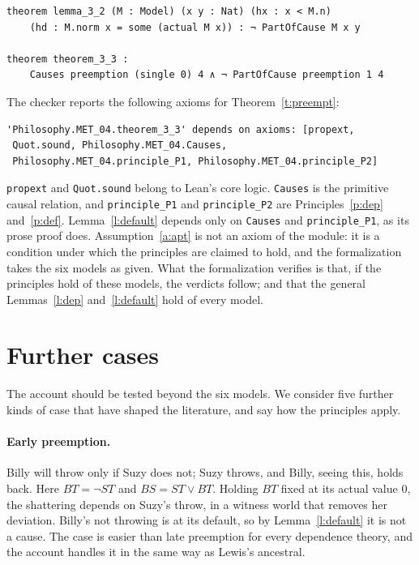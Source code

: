 \documentclass{situationist-preprint}
\begin{document}
\begin{lstlisting}
theorem lemma_3_2 (M : Model) (x y : Nat) (hx : x < M.n)
    (hd : M.norm x = some (actual M x)) : ¬ PartOfCause M x y

theorem theorem_3_3 :
    Causes preemption (single 0) 4 ∧ ¬ PartOfCause preemption 1 4
\end{lstlisting}

The checker reports the following axioms for Theorem~\ref{t:preempt}:

\begin{lstlisting}
'Philosophy.MET_04.theorem_3_3' depends on axioms: [propext,
 Quot.sound, Philosophy.MET_04.Causes,
 Philosophy.MET_04.principle_P1, Philosophy.MET_04.principle_P2]
\end{lstlisting}

\texttt{propext} and \texttt{Quot.sound} belong to Lean's core logic. \texttt{Causes} is the primitive causal relation, and \texttt{principle\_P1} and \texttt{principle\_P2} are Principles~\ref{p:dep} and~\ref{p:def}. Lemma~\ref{l:default} depends only on \texttt{Causes} and \texttt{principle\_P1}, as its prose proof does. Assumption~\ref{a:apt} is not an axiom of the module: it is a condition under which the principles are claimed to hold, and the formalization takes the six models as given. What the formalization verifies is that, if the principles hold of these models, the verdicts follow; and that the general Lemmas~\ref{l:dep} and~\ref{l:default} hold of every model.

\section{Further cases}\label{s:cases}

The account should be tested beyond the six models. We consider five further kinds of case that have shaped the literature, and say how the principles apply.

\paragraph{Early preemption.} Billy will throw only if Suzy does not; Suzy throws, and Billy, seeing this, holds back. Here $\mathit{BT} = \neg \mathit{ST}$ and $\mathit{BS} = \mathit{ST} \vee \mathit{BT}$. Holding $\mathit{BT}$ fixed at its actual value $0$, the shattering depends on Suzy's throw, in a witness world that removes her deviation. Billy's not throwing is at its default, so by Lemma~\ref{l:default} it is not a cause. The case is easier than late preemption for every dependence theory, and the account handles it in the same way as Lewis's ancestral.
\end{document}
